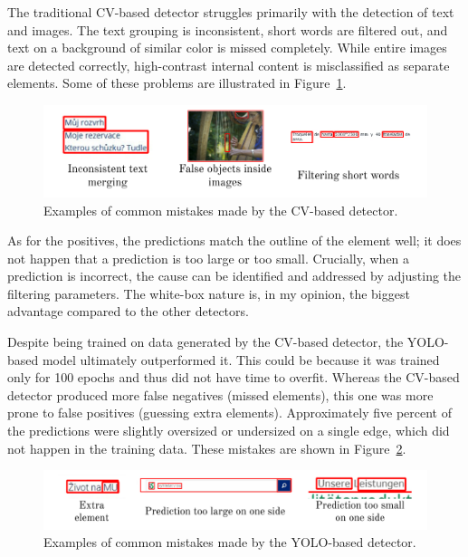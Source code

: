 \documentclass[
  digital,     %
  oneside,     %
  nosansbold,  %
  nocolorbold, %
  lof,         %
  lot,         %
]{fithesis4}
\begin{document}
The traditional CV-based detector struggles primarily with the detection of text and images. The text grouping is inconsistent, short words are filtered out, and text on a background of similar color is missed completely. While entire images are detected correctly, high-contrast internal content is misclassified as separate elements. Some of these problems are illustrated in Figure~\ref{fig:cv-mistakes}.

\begin{figure}[h]
    \centering
    \includegraphics[width=1\linewidth]{diagrams/cv_mistakes.pdf}
    \caption{Examples of common mistakes made by the CV-based detector.}
    \label{fig:cv-mistakes}
\end{figure}

As for the positives, the predictions match the outline of the element well; it does not happen that a prediction is too large or too small. Crucially, when a prediction is incorrect, the cause can be identified and addressed by adjusting the filtering parameters. The white-box nature is, in my opinion, the biggest advantage compared to the other detectors.

Despite being trained on data generated by the CV-based detector, the YOLO-based model ultimately outperformed it. This could be because it was trained only for 100 epochs and thus did not have time to overfit. Whereas the CV-based detector produced more false negatives (missed elements), this one was more prone to false positives (guessing extra elements). Approximately five percent of the predictions were slightly oversized or undersized on a single edge, which did not happen in the training data. These mistakes are shown in Figure~\ref{fig:yolo-mistakes}.

\begin{figure}
    \centering
    \includegraphics[width=1\linewidth]{diagrams/yolo_mistakes.pdf}
    \caption{Examples of common mistakes made by the YOLO-based detector.}
    \label{fig:yolo-mistakes}
\end{figure}
\end{document}

